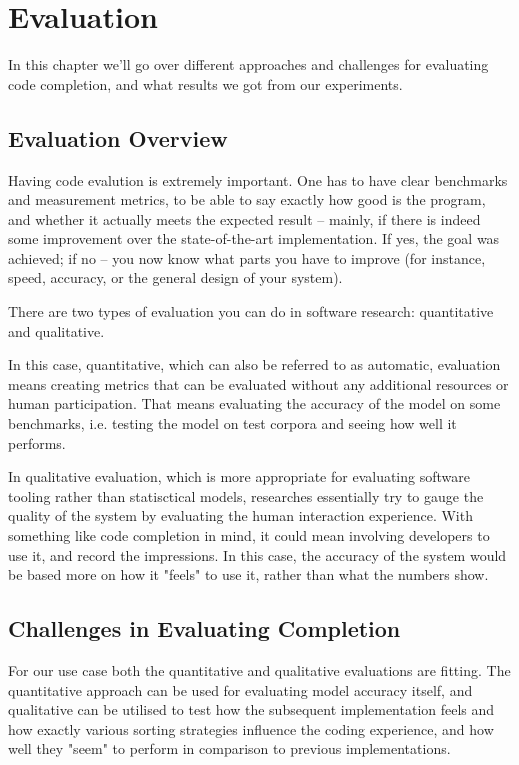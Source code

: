\chapter{Evaluation}
\label{chap:Evaluation}

In this chapter we'll go over different approaches and challenges for evaluating code completion, and what results we got from our experiments.

\section{Evaluation Overview}
\label{sec:Evaluation-Overview}
Having code evalution is extremely important. One has to have clear benchmarks and measurement metrics, to be able to say exactly how good is the program, and whether it actually meets the expected result -- mainly, if there is indeed some improvement over the state-of-the-art implementation. If yes, the goal was achieved; if no -- you now know what parts you have to improve (for instance, speed, accuracy, or the general design of your system).

There are two types of evaluation you can do in software research: quantitative and qualitative.

In this case, quantitative, which can also be referred to as automatic, evaluation means creating metrics that can be evaluated without any additional resources or human participation. That means evaluating the accuracy of the model on some benchmarks, i.e. testing the model on test corpora and seeing how well it performs.

In qualitative evaluation, which is more appropriate for evaluating software tooling rather than statisctical models, researches essentially try to gauge the quality of the system by evaluating the human interaction experience. With something like code completion in mind, it could mean involving developers to use it, and record the impressions. In this case, the accuracy of the system would be based more on how it "feels" to use it, rather than what the numbers show.

\section{Challenges in Evaluating Completion}
\label{sec:Evaluation-Challenges}
For our use case both the quantitative and qualitative evaluations are fitting. The quantitative approach can be used for evaluating model accuracy itself, and qualitative can be utilised to test how the subsequent implementation feels and how exactly various sorting strategies influence the coding experience, and how well they "seem" to perform in comparison to previous implementations.

